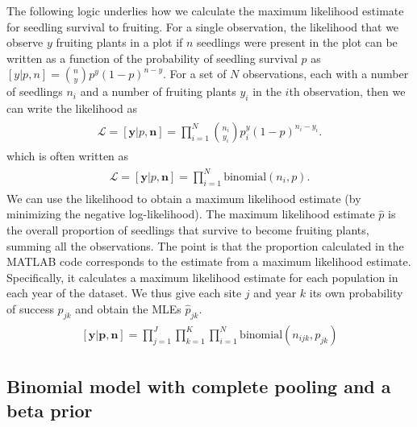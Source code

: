 \documentclass[12pt, oneside, titlepage]{article}   	%
\begin{document}
The following logic underlies how we calculate the maximum likelihood estimate for seedling survival to fruiting. For a single observation, the likelihood that we observe $y$ fruiting plants in a plot if $n$ seedlings were present in the plot can be written as a function of the probability of seedling survival $p$ as $[y|p,n] = \binom{n}{y}p^y(1-p)^{n-y}$. For a set of $N$ observations, each with a number of seedlings $n_i$ and a number of fruiting plants $y_i$ in the $i$th observation, then we can write the likelihood as
%
\begin{align}
  \begin{split}
\mathcal{L} = [\bm{y}|p,\bm{n}]  = \prod_{i=1}^N \binom{n_i}{y_i}p^y_i(1-p)^{n_i-y_i}.
  \end{split}
\end{align}
%
which is often written as
%
\begin{align}
  \begin{split}
\mathcal{L} = [\bm{y}|p,\bm{n}]  = \prod_{i=1}^N \mathrm{binomial}(n_i,p).
  \end{split}
\end{align}
We can use the likelihood to obtain a maximum likelihood estimate (by minimizing the negative log-likelihood). The maximum likelihood estimate $\hat{p}$ is the overall proportion of seedlings that survive to become fruiting plants, summing all the observations. The point is that the proportion calculated in the MATLAB code corresponds to the estimate from a maximum likelihood estimate. Specifically, it calculates a maximum likelihood estimate for each population in each year of the dataset. We thus give each site $j$ and year $k$ its own probability of success $p_{jk}$ and obtain the MLEs $\hat{p}_{jk}$.
%
\begin{align}
  \begin{split}
[\bm{y}|\bm{p},\bm{n}]  = \prod_{j=1}^J\prod_{k=1}^K\prod_{i=1}^N \mathrm{binomial}(n_{ijk},p_{jk}) 
  \end{split}
\end{align}

\subsection*{Binomial model with complete pooling and a beta prior}
\end{document}
